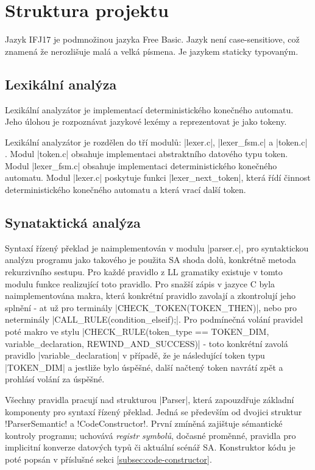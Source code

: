 \section{Struktura projektu}
Jazyk IFJ17 je podmnožinou jazyka Free Basic. Jazyk není case-sensitiove,
což znamená že nerozlišuje malá a velká písmena. Je jazykem staticky typovaným.
\subsection{Lexikální analýza}
Lexikální analyzátor je implementací deterministického konečného
automatu. Jeho úlohou je rozpoznávat jazykové lexémy a reprezentovat
je jako tokeny.

Lexikální analyzátor je rozdělen do tří modulů: \ic|lexer.c|, \ic|lexer_fsm.c| a \ic|token.c|
. Modul \ic|token.c| obsahuje implementaci abstraktního datového typu token. Modul \ic|lexer_fsm.c|
obsahuje implementaci deterministického konečného automatu. Modul \ic|lexer.c| poskytuje funkci
\ic|lexer_next_token|, která řídí činnost deterministického konečného automatu a
která vrací další token.

\subsection{Synataktická analýza}
Syntaxí řízený překlad je naimplementován v modulu \ic|parser.c|, pro syntaktickou analýzu programu jako takového je
použita SA shoda dolů, konkrétně metoda rekurzivního sestupu. Pro každé pravidlo z LL gramatiky existuje v tomto
modulu funkce realizující toto pravidlo. Pro snažší zápis v jazyce C byla naimplementována makra,
která konkrétní pravidlo zavolají a zkontrolují jeho splnění - at už pro terminály \ic|CHECK_TOKEN(TOKEN_THEN)|,
nebo pro neterminály \ic|CALL_RULE(condition_elseif);|. Pro podmínečná volání pravidel poté makro ve stylu
\ic|CHECK_RULE(token_type == TOKEN_DIM, variable_declaration, REWIND_AND_SUCCESS)| - toto konkrétní zavolá pravidlo
\ic|variable_declaration| v případě, že je následující token typu \ic|TOKEN_DIM| a jestliže bylo úspěšné, další načtený
token navrátí zpět a prohlásí volání za úspěšné.

Všechny pravidla pracují nad strukturou \ic|Parser|, která zapouzdřuje základní komponenty pro syntaxí řízený překlad.
Jedná se především od dvojici struktur \ic!ParserSemantic! a \ic!CodeConstructor!. První zmíněná zajištuje sémantické
kontroly programu; uchovává \emph{registr symbolů}, dočasné proměnné, pravidla pro implicitní konverze datových typů či
aktuální scénář SA. Konstruktor kódu je poté popsán v příslušné sekci \ref{subsec:code-constructor}.


